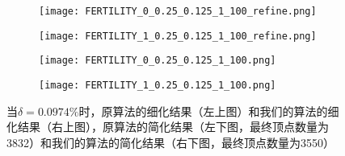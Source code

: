 \begin{figure}[htbp]
  \centering
  \begin{subfigure}[b]{0.4\textwidth}
    \texttt{[image: FERTILITY\_0\_0.25\_0.125\_1\_100\_refine.png]}
  \end{subfigure}
  \begin{subfigure}[b]{0.4\textwidth}
    \texttt{[image: FERTILITY\_1\_0.25\_0.125\_1\_100\_refine.png]}
  \end{subfigure}
  \begin{subfigure}[b]{0.4\textwidth}
    \texttt{[image: FERTILITY\_0\_0.25\_0.125\_1\_100.png]}
  \end{subfigure}
  \begin{subfigure}[b]{0.4\textwidth}
    \texttt{[image: FERTILITY\_1\_0.25\_0.125\_1\_100.png]}
  \end{subfigure}
  \caption[当$\delta=0.0974\%$时fertility结果对比]{当$\delta=0.0974\%$时，原算法的细化结果（左上图）和我们的算法的细化结果（右上图），原算法的简化结果（左下图，最终顶点数量为3832）和我们的算法的简化结果（右下图，最终顶点数量为3550）}
  \label{fig:fertility-res2}
\end{figure}


